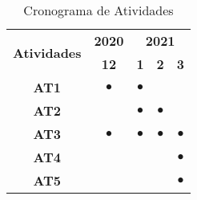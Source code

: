 \begin{table}[h!]
    \centering
    \footnotesize
    \def \arraystretch{0.8}
    \caption{Cronograma de Atividades}
    \begin{tabular}{|c|c|c|c|c|}
        \hline
        \multirow{2}{*}{\bf Atividades} &  \multicolumn{1}{c|}{\bf 2020} & \multicolumn{3}{c|}{\bf 2021} \\
        \cline{2-5} & \bf 12 & \bf 1 & \bf 2 & \bf 3\\  
        \hline
        \bf AT1 & $\bullet$ & $\bullet$ & &\\
        \hline
        \bf AT2 &  & $\bullet$ & $\bullet$ &\\
        \hline
        \bf AT3 & $\bullet$ & $\bullet$ & $\bullet$ & $\bullet$ \\
        \hline
        \bf AT4 & & & & $\bullet$ \\
        \hline
        \bf AT5 & & &  & $\bullet$ \\
        \hline
    \end{tabular}
    \label{tabela_cronograma}
\end{table}